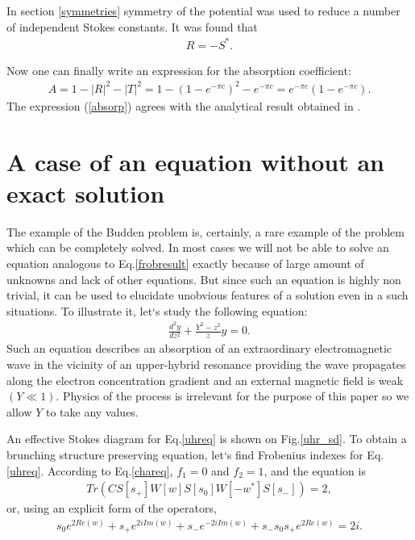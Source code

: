 \documentclass[aps,prl,preprint,superscriptaddress]{revtex4}
\begin{document}
In section \ref{symmetries} symmetry of the potential was used to reduce a number of independent Stokes constants. It was found that
\begin{eqnarray}
R=-S^*. 
\end{eqnarray}

Now one can finally write an expression for the absorption coefficient:
\begin{eqnarray}
A=1-|R|^2-|T|^2=1-(1-e^{-\pi c})^2-e^{-\pi c}=e^{-\pi c}(1-e^{-\pi c}).    \label{absorp}
\end{eqnarray}
The expression (\ref{absorp}) agrees with the analytical result obtained in \cite[p 234]{rwbook}.

\section{A case of an equation without an exact solution \label{UHR}}
The example of the Budden problem is, certainly, a rare example of the problem which can be completely solved. In most cases we will not be able to solve an equation analogous to Eq.\ref{frobresult} exactly because of large amount of unknowns and lack of other equations. But since such an equation is highly non trivial, it can be used to elucidate unobvious features of a solution even in a such situations. To illustrate it, let`s study the following equation:
\begin{eqnarray}
\frac{d^2y}{dz^2} + \frac{Y^2-z^2}{z}y = 0.  \label{uhreq}
\end{eqnarray}
Such an equation describes an absorption of an extraordinary electromagnetic wave in the vicinity of an upper-hybrid resonance providing the wave propagates along the electron concentration gradient and an external magnetic field is weak $(Y \ll 1)$. Physics of the process is irrelevant for the purpose of this paper so we allow $Y$ to take any values.

An effective Stokes diagram for Eq.\ref{uhreq} is shown on Fig.\ref{uhr_sd}. To obtain a brunching structure preserving equation, let`s find Frobenius indexes for Eq.\ref{uhreq}. According to Eq.\ref{chareq}, $f_1=0$ and $f_2=1$, and the equation is
\begin{eqnarray}
Tr(CS[s_+]W[w]S[s_0]W[-w^*]S[s_-])=2,  
\end{eqnarray}
or, using an explicit form of the operators,
\begin{eqnarray}
s_0e^{2Re(w)} + s_+e^{2iIm(w)} + s_-e^{-2iIm(w)} +s_-s_0s_+e^{2Re(w)}=2i.   \label{uhr_frob}
\end{eqnarray}
\end{document}
